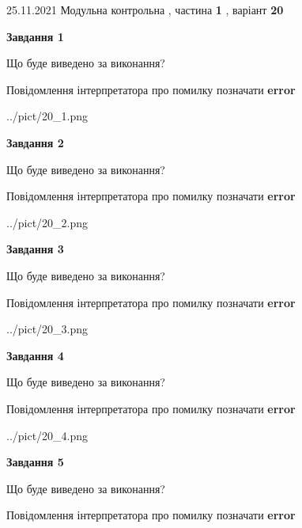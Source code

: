 \documentclass[10pt, ukrainian]{article}
\begin{document}
{25.11.2021 Модульна контрольна , частина \textbf { 1 }, варіант  \No \textbf { 20 }\par}
{
\begin {large}

{\begin {center}\textbf{Завдання 1}\end {center}}\par
Що буде виведено за виконання? \par
Повідомлення інтерпретатора про помилку позначати \textbf{error}

\begin{center}
	{../pict/20_1.png}
\end{center}
\newpage

{\begin {center}\textbf{Завдання 2}\end {center}}\par
Що буде виведено за виконання? \par
Повідомлення інтерпретатора про помилку позначати \textbf{error}

\begin{center}
	{../pict/20_2.png}
\end{center}
\newpage

{\begin {center}\textbf{Завдання 3}\end {center}}\par
Що буде виведено за виконання? \par
Повідомлення інтерпретатора про помилку позначати \textbf{error}

\begin{center}
	{../pict/20_3.png}
\end{center}
\newpage

{\begin {center}\textbf{Завдання 4}\end {center}}\par
Що буде виведено за виконання? \par
Повідомлення інтерпретатора про помилку позначати \textbf{error}

\begin{center}
	{../pict/20_4.png}
\end{center}
\newpage

{\begin {center}\textbf{Завдання 5}\end {center}}\par
Що буде виведено за виконання? \par
Повідомлення інтерпретатора про помилку позначати \textbf{error}


\end{large}}
\end{document}
